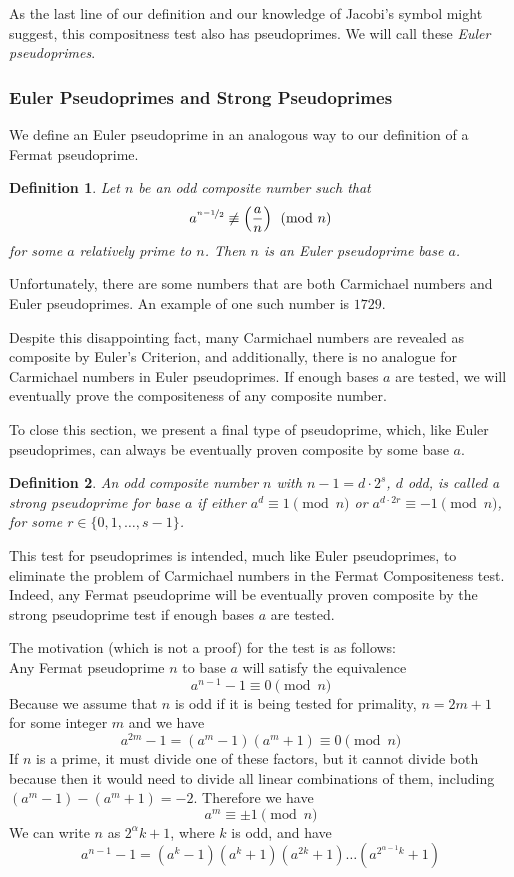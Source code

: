 \documentclass{article}
\newtheorem*{definition}{Definition}
\begin{document}
As the last line of our definition and our knowledge of Jacobi's symbol might suggest, this compositness test also has pseudoprimes. We will call these \textit{Euler pseudoprimes}.

\subsubsection*{Euler Pseudoprimes and Strong Pseudoprimes}
We define an Euler pseudoprime in an analogous way to our definition of a Fermat pseudoprime.
\begin{definition}
Let $n$ be an odd composite number such that
	 $$a^{\nicefrac{n-1}{2}} \not\equiv \left(\dfrac{a}{n}\right) \pmod n$$ 
for some $a$ relatively prime to $n$.  Then $n$ is an \textit{Euler pseudoprime} base $a$.
\end{definition}

\par Unfortunately, there are some numbers that are both Carmichael numbers and Euler pseudoprimes. An example of one such number is $1729$.
\par Despite this disappointing fact,  many Carmichael numbers are revealed as composite by Euler's Criterion, and additionally, there is no analogue for Carmichael numbers in Euler pseudoprimes. If enough bases $a$ are tested, we will eventually prove the compositeness of any composite number.

\par To close this section, we present a final type of pseudoprime, which, like Euler pseudoprimes, can always be eventually proven composite by some base $a$.
\begin{definition}
An odd composite number $n$ with $n-1 = d\cdot2^s$, $d$ odd, is called a \textit{strong pseudoprime} for base $a$ if either
$a^d \equiv 1 \pmod n$ or $a^{d \cdot 2r} \equiv -1 \pmod n$, for some $r \in \{0, 1, \ldots, s-1\}$. 
\end{definition}

\par This test for pseudoprimes is intended, much like Euler pseudoprimes, to eliminate the problem of Carmichael numbers in the Fermat Compositeness test. Indeed, any Fermat pseudoprime will be eventually proven composite by the strong pseudoprime test if enough bases $a$ are tested.

\par The motivation (which is not a proof) for the test is as follows:
\\Any Fermat pseudoprime $n$ to base $a$ will satisfy the equivalence
	$$a^{n-1} - 1 \equiv 0 \pmod n$$
Because we assume that $n$ is odd if it is being tested for primality, $n = 2m+1$ for some integer $m$ and we have
	$$a^{2m} - 1 = (a^m - 1)(a^m+1) \equiv 0 \pmod{n}$$
If $n$ is a prime, it must divide one of these factors, but it cannot divide both because then it would need to divide all linear
combinations of them, including $(a^m - 1) - (a^m + 1) = -2$. Therefore we have 
	$$a^m \equiv \pm 1 \pmod n$$
We can write $n$ as $2^\alpha k + 1$, where $k$ is odd, and have 
	$$a^{n-1} - 1 = (a^k - 1)(a^k + 1)(a^{2k} + 1) \ldots (a^{2^{\alpha - 1} k} +1)$$
	
\end{document}
